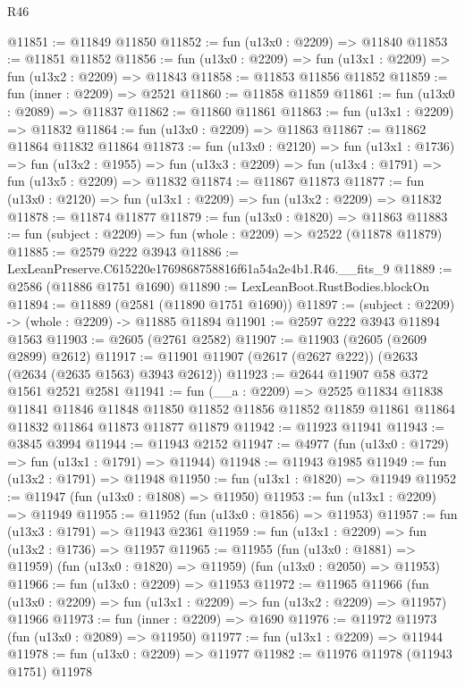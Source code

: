 \begin{lexlean}{R46}
\begin{coremodule}
@11851 := @11849 @11850
@11852 := fun (u13x0 : @2209) => @11840
@11853 := @11851 @11852
@11856 := fun (u13x0 : @2209) => fun (u13x1 : @2209) => fun (u13x2 : @2209) => @11843
@11858 := @11853 @11856 @11852
@11859 := fun (inner : @2209) => @2521
@11860 := @11858 @11859
@11861 := fun (u13x0 : @2089) => @11837
@11862 := @11860 @11861
@11863 := fun (u13x1 : @2209) => @11832
@11864 := fun (u13x0 : @2209) => @11863
@11867 := @11862 @11864 @11832 @11864
@11873 := fun (u13x0 : @2120) =>
  fun (u13x1 : @1736) =>
  fun (u13x2 : @1955) => fun (u13x3 : @2209) => fun (u13x4 : @1791) => fun (u13x5 : @2209) => @11832
@11874 := @11867 @11873
@11877 := fun (u13x0 : @2120) => fun (u13x1 : @2209) => fun (u13x2 : @2209) => @11832
@11878 := @11874 @11877
@11879 := fun (u13x0 : @1820) => @11863
@11883 := fun (subject : @2209) => fun (whole : @2209) => @2522 (@11878 @11879)
@11885 := @2579 @222 @3943
@11886 := LexLeanPreserve.C615220e1769868758816f61a54a2e4b1.R46.__fits_9
@11889 := @2586 (@11886 @1751 @1690)
@11890 := LexLeanBoot.RustBodies.blockOn
@11894 := @11889 (@2581 (@11890 @1751 @1690))
@11897 := (subject : @2209) -> (whole : @2209) -> @11885 @11894
@11901 := @2597 @222 @3943 @11894 @1563
@11903 := @2605 (@2761 @2582)
@11907 := @11903 (@2605 (@2609 @2899) @2612)
@11917 := @11901 @11907 (@2617 (@2627 @222)) (@2633 (@2634 (@2635 @1563) @3943 @2612))
@11923 := @2644 @11907 @58 @372 @1561 @2521 @2581
@11941 := fun (__a : @2209) =>
  @2525
    @11834
    @11838
    @11841
    @11846
    @11848
    @11850
    @11852
    @11856
    @11852
    @11859
    @11861
    @11864
    @11832
    @11864
    @11873
    @11877
    @11879
@11942 := @11923 @11941
@11943 := @3845 @3994
@11944 := @11943 @2152
@11947 := @4977 (fun (u13x0 : @1729) => fun (u13x1 : @1791) => @11944)
@11948 := @11943 @1985
@11949 := fun (u13x2 : @1791) => @11948
@11950 := fun (u13x1 : @1820) => @11949
@11952 := @11947 (fun (u13x0 : @1808) => @11950)
@11953 := fun (u13x1 : @2209) => @11949
@11955 := @11952 (fun (u13x0 : @1856) => @11953)
@11957 := fun (u13x3 : @1791) => @11943 @2361
@11959 := fun (u13x1 : @2209) => fun (u13x2 : @1736) => @11957
@11965 := @11955
    (fun (u13x0 : @1881) => @11959)
    (fun (u13x0 : @1820) => @11959)
    (fun (u13x0 : @2050) => @11953)
@11966 := fun (u13x0 : @2209) => @11953
@11972 := @11965
    @11966
    (fun (u13x0 : @2209) => fun (u13x1 : @2209) => fun (u13x2 : @2209) => @11957)
    @11966
@11973 := fun (inner : @2209) => @1690
@11976 := @11972 @11973 (fun (u13x0 : @2089) => @11950)
@11977 := fun (u13x1 : @2209) => @11944
@11978 := fun (u13x0 : @2209) => @11977
@11982 := @11976 @11978 (@11943 @1751) @11978

\end{coremodule}
\end{lexlean}
